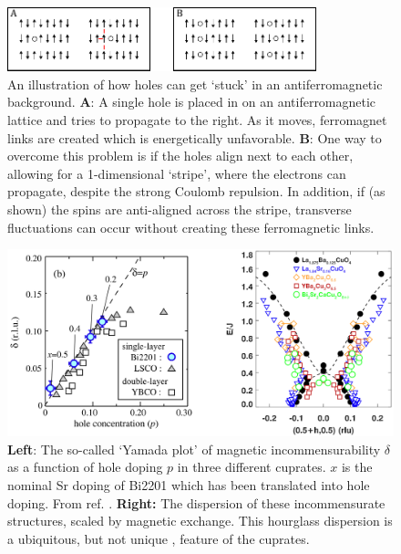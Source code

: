 \begin{figure}
    \centering
    \includegraphics[width=0.8\textwidth]{fig/intro/electronic_traffic_jam.pdf}
    \caption[electron traffic jam analogy]{An illustration of how holes can get `stuck' in an antiferromagnetic background. \textbf{A}: A single hole is placed in on an antiferromagnetic lattice and tries to propagate to the right. As it moves, ferromagnet links are created which is energetically unfavorable. \textbf{B}: One way to overcome this problem is if the holes align next to each other, allowing for a 1-dimensional `stripe', where the electrons can propagate, despite the strong Coulomb repulsion. In addition, if (as shown) the spins are anti-aligned across the stripe, transverse fluctuations can occur without creating these ferromagnetic links.}
    \label{fig:electron_traffic_jam}
\end{figure}

\begin{figure}
    \centering
    \includegraphics[width=\textwidth]{fig/intro/yamada_hourglass.png}
    \caption[yamada plot plus hourglass]{\textbf{Left}: The so-called `Yamada plot' \cite{Yamada1998} of magnetic incommensurability $\delta$ as a function of hole doping $p$ in three different cuprates. $x$ is the nominal Sr doping of Bi2201 which has been translated into hole doping. From ref. \cite{Enoki2013}. \textbf{Right:} The dispersion of these incommensurate structures, scaled by magnetic exchange. This hourglass dispersion is a ubiquitous, but not unique \cite{Drees2013, Drees2014},  feature of the cuprates.}
    \label{fig:yamada_plot}
\end{figure}

